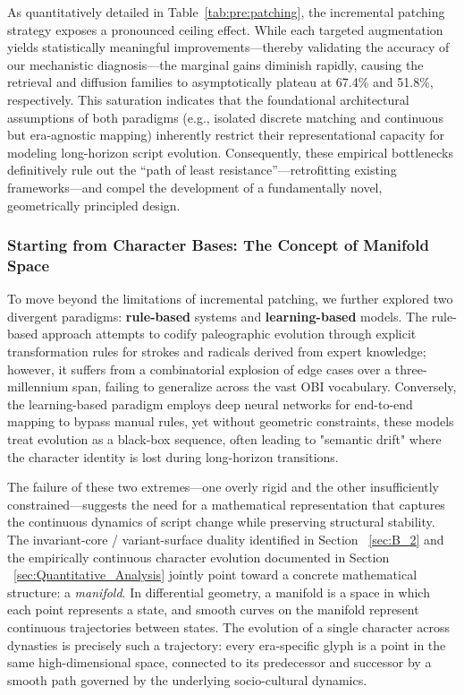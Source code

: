\documentclass{article}
\begin{document}
As quantitatively detailed in Table~\ref{tab:pre:patching}, the incremental patching strategy exposes a pronounced ceiling effect. While each targeted augmentation yields statistically meaningful improvements—thereby validating the accuracy of our mechanistic diagnosis—the marginal gains diminish rapidly, causing the retrieval and diffusion families to asymptotically plateau at 67.4\% and 51.8\%, respectively. This saturation indicates that the foundational architectural assumptions of both paradigms (e.g., isolated discrete matching and continuous but era-agnostic mapping) inherently restrict their representational capacity for modeling long-horizon script evolution. Consequently, these empirical bottlenecks definitively rule out the ``path of least resistance''—retrofitting existing frameworks—and compel the development of a fundamentally novel, geometrically principled design.

\subsubsection{Starting from Character Bases: The Concept of Manifold Space}
\label{sec:pre:s11}

To move beyond the limitations of incremental patching, we further explored two divergent paradigms: \textbf{rule-based} systems and \textbf{learning-based} models. The rule-based approach attempts to codify paleographic evolution through explicit transformation rules for strokes and radicals derived from expert knowledge; however, it suffers from a combinatorial explosion of edge cases over a three-millennium span, failing to generalize across the vast OBI vocabulary. Conversely, the learning-based paradigm employs deep neural networks for end-to-end mapping to bypass manual rules, yet without geometric constraints, these models treat evolution as a black-box sequence, often leading to "semantic drift" where the character identity is lost during long-horizon transitions.

The failure of these two extremes—one overly rigid and the other insufficiently constrained—suggests the need for a mathematical representation that captures the continuous dynamics of script change while preserving structural stability. The invariant-core / variant-surface duality identified in Section ~\ref{sec:B_2} and the empirically continuous character evolution documented in Section ~\ref{sec:Quantitative_Analysis} jointly point toward a concrete mathematical structure: a \emph{manifold}. In differential geometry, a manifold is a space in which each point represents a state, and smooth curves on the manifold represent continuous trajectories between states. The evolution of a single character across dynasties is precisely such a trajectory: every era-specific glyph is a point in the same high-dimensional space, connected to its predecessor and successor by a smooth path governed by the underlying socio-cultural dynamics.
\end{document}
